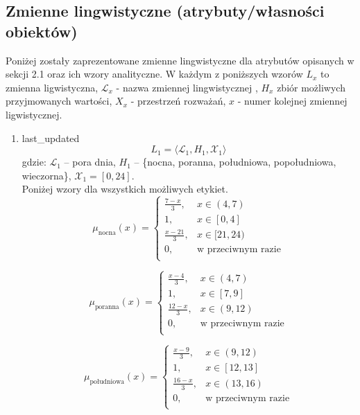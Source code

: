 \documentclass{article}
\begin{document}
\subsection{Zmienne lingwistyczne (atrybuty/własności obiektów)}
Poniżej zostały zaprezentowane zmienne lingwistyczne dla atrybutów opisanych w sekcji 2.1 oraz ich wzory analityczne. W każdym z poniższych wzorów \(L_x\) to zmienna ligwistyczna, $\mathcal{L}_x$ - nazwa zmiennej lingwistycznej , \(H_x\) zbiór możliwych przyjmowanych wartości, \(X_x\) - przestrzeń rozważań, \(x\) - numer kolejnej zmiennej ligwistycznej. 
\begin{enumerate}
    \item last\_updated
        \begin{equation}
            L_1 = \langle \mathcal{L}_1, H_1, \mathcal{X}_1 \rangle
        \end{equation}
        gdzie: $\mathcal{L}_1$ – pora dnia, $H_1$ – \{nocna, poranna, południowa, popołudniowa, wieczorna\}, $\mathcal{X}_1 = [0, 24]$. \\
        Poniżej wzory dla wszystkich możliwych etykiet.
        \begin{equation}
            \mu_{\text{nocna}}(x) =
            \begin{cases}
            \frac{7 - x}{3}, & x \in (4, 7) \\
            1, & x \in [0, 4] \\
            \frac{x - 21}{3}, & x \in [21, 24) \\
            0, & \text{w przeciwnym razie} \\
            \end{cases}
        \end{equation}

        \begin{equation}
            \mu_{\text{poranna}}(x) =
            \begin{cases}
            \frac{x - 4}{3}, & x \in (4, 7) \\
            1, & x \in [7, 9] \\
            \frac{12 - x}{3}, & x \in (9, 12) \\
            0, & \text{w przeciwnym razie} \\
            \end{cases}
        \end{equation}

        \begin{equation}
            \mu_{\text{południowa}}(x) =
            \begin{cases}
            \frac{x - 9}{3}, & x \in (9, 12) \\
            1, & x \in [12, 13] \\
            \frac{16 - x}{3}, & x \in (13, 16) \\
            0, & \text{w przeciwnym razie} \\
            \end{cases}
        \end{equation}


\end{enumerate}
\end{document}
